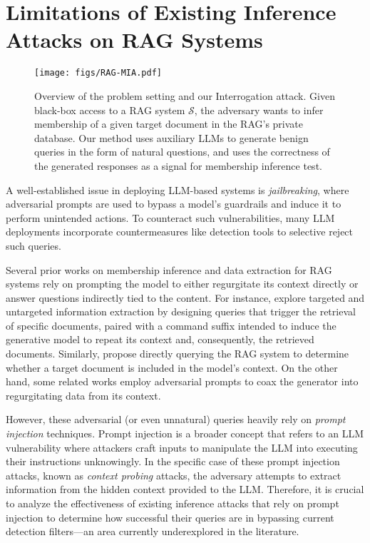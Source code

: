 \section{Limitations of Existing Inference Attacks on RAG Systems}
\label{sec:existing_rag_inference}



\begin{figure*}[h!]
    \centering
    \texttt{[image: figs/RAG-MIA.pdf]}
    \caption{Overview of the problem setting and our Interrogation attack. Given black-box access to a RAG system $\mathcal{S}$, the adversary wants to infer membership of a given target document in the RAG's private database. Our method uses auxiliary LLMs to generate benign queries in the form of natural questions, and uses the correctness of the generated responses as a signal for membership inference test.}
    \label{fig:system_diagram}
\end{figure*}

A well-established issue in deploying LLM-based systems is \textit{jailbreaking}, where adversarial prompts are used to bypass a model's guardrails and induce it to perform unintended actions. To counteract such vulnerabilities, many LLM deployments incorporate countermeasures like detection tools to selective reject such queries.

Several prior works on membership inference and data extraction for RAG systems rely on prompting the model to either regurgitate its context directly or answer questions indirectly tied to the content. For instance, \citet{zeng2024good} explore targeted and untargeted information extraction by designing queries that trigger the retrieval of specific documents, paired with a command suffix intended to induce the generative model to repeat its context and, consequently, the retrieved documents. Similarly, \citet{anderson2024my} propose directly querying the RAG system to determine whether a target document is included in the model's context. On the other hand, some related works \citep{qi2024follow, cohen2024unleashing} employ adversarial prompts to coax the generator into regurgitating data from its context.

However, these adversarial (or even unnatural) queries heavily rely on \emph{prompt injection} techniques. Prompt injection \citep{perez2022ignore} is a broader concept that refers to an LLM vulnerability where attackers craft inputs to manipulate the LLM into executing their instructions unknowingly. In the specific case of these prompt injection attacks, known as \emph{context probing} attacks, the adversary attempts to extract information from the hidden context provided to the LLM. Therefore, it is crucial to analyze the effectiveness of existing inference attacks that rely on prompt injection to determine how successful their queries are in bypassing current detection filters—an area currently underexplored in the literature.

